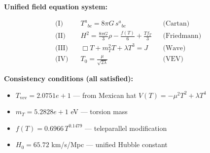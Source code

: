 
\textbf{Unified field equation system:}

\begin{align}
  \text{(I)} \quad & T^a{}_{bc} = 8\pi G \, s^a{}_{bc} && \text{(Cartan)} \\
  \text{(II)} \quad & H^2 = \frac{8\pi G}{3}\rho - \frac{f(T)}{6} + \frac{Tf_T}{3} && \text{(Friedmann)} \\
  \text{(III)} \quad & \Box T + m_T^2 T + \lambda T^3 = J && \text{(Wave)} \\
  \text{(IV)} \quad & T_0 = \frac{\mu}{\sqrt{2\lambda}} && \text{(VEV)}
\end{align}

\textbf{Consistency conditions (all satisfied):}
\begin{itemize}
  \item $T_{\text{vev}} = 2.0751e+1$ — from Mexican hat $V(T) = -\mu^2 T^2 + \lambda T^4$
  \item $m_T = 5.2828e+1$ eV — torsion mass
  \item $f(T) = 0.6966 \, T^{0.1479}$ — teleparallel modification
  \item $H_0 = 65.72$ km/s/Mpc — unified Hubble constant
\end{itemize}